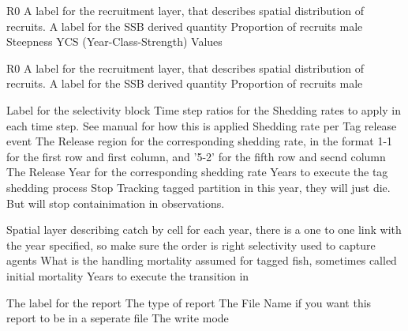  {R0}
 {A label for the recruitment layer, that describes spatial distribution of recruits.}
 {A label for the SSB derived quantity}
 {Proportion of recruits male}
 {}
 {}
 {Steepness}
 {YCS (Year-Class-Strength) Values}
\par\textbf{}\par
{} {R0}
 {A label for the recruitment layer, that describes spatial distribution of recruits.}
 {A label for the SSB derived quantity}
 {Proportion of recruits male}
 {}
 {}
\par\textbf{}\par
{} {Label for the selectivity block}
 {Time step ratios for the Shedding rates to apply in each time step. See manual for how this is applied}
 {Shedding rate per Tag release event}
 {The Release region for the corresponding shedding rate, in the format 1-1 for the first row and first column, and '5-2' for the fifth row and secnd column}
 {The Release Year for the corresponding shedding rate}
 {Years to execute the tag shedding process}
 {Stop Tracking tagged partition in this year, they will just die. But will stop containimation in observations.}
\par\textbf{}\par
{} {Spatial layer describing catch by cell for each year, there is a one to one link with the year specified, so make sure the order is right}
 {selectivity used to capture agents}
 {What is the handling mortality assumed for tagged fish, sometimes called initial mortality}
 {Years to execute the transition in}
\par\par
{} {The label for the report}
 {The type of report}
 {The File Name if you want this report to be in a seperate file}
 {The write mode}
\par\textbf{}\par
